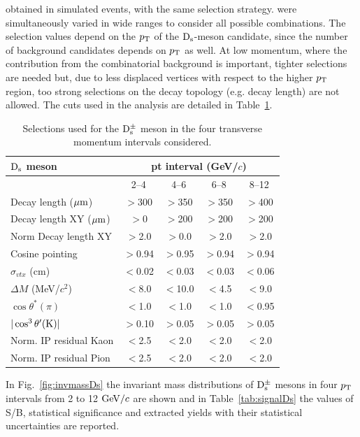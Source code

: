    obtained in simulated events, with the same selection strategy.
were simultaneously varied in wide ranges to consider all possible combinations. 
The selection values depend on the $p_{\rm T}$ of the ${\rm D_s}$-meson candidate, since
the number of background candidates depends on $p_{\rm T}$ as well.
At low momentum, where the contribution from the combinatorial
background is important, tighter selections are needed but, due to less displaced 
vertices with respect to the higher $p_{\rm T}$ region, too strong selections
on the decay topology (e.g. decay length) are not allowed.
The cuts used in the analysis are detailed in Table~\ref{tab:cutsDs}.
\begin{table}[tbh!]
\centering
\begin{tabular}{|l|c|c|c|c|} 
\hline 
 ${\rm D_s}$ meson& \multicolumn{4}{c|}{pt interval (GeV/$c$)}\\
\hline
 & 2--4  & 4--6 & 6--8 & 8--12\\
\hline
Decay length ($\mathrm{\mu m}$)        & $>$300 & $>$350 & $>$350 & $>$400\\
Decay length XY ($\mathrm{\mu m}$)     & $>$0 & $>$200 & $>$200 & $>$200\\
Norm Decay length XY          & $>$2.0& $>$0.0 & $>$2.0 & $>$2.0\\
Cosine pointing              & $>$0.94 & $>$0.95 & $>$0.94 & $>$0.94\\
$\sigma_{vtx}$  (cm)          & $<$0.02 & $<$0.03 & $<$0.03 & $<$0.06\\
$\Delta M$ (MeV/$c^{2}$) & $<$8.0 & $<$10.0 & $<$4.5 & $<$9.0\\
$\cos \theta^*(\pi)$    & $<$1.0 & $<$1.0 & $<$1.0 & $<$0.95\\
$|\cos^3 \theta^\prime({\rm K})|$        & $>$0.10 & $>$0.05 & $>$0.05 & $>$0.05\\
Norm. IP residual Kaon  & $<$2.5 & $<$2.0 & $<$2.0 & $<$2.0 \\
Norm. IP residual Pion  & $<$2.5 & $<$2.0 & $<$2.0 & $<$2.0 \\[1ex]
\hline
\end{tabular}
\caption{Selections used for the ${\rm D_s^{\pm}}$ meson in the four transverse momentum intervals considered.} 
\label{tab:cutsDs}
\end{table}
In Fig.~\ref{fig:invmassDs} the invariant mass distributions 
of ${\rm D_s^{\pm}}$ mesons in four $p_{\rm T}$ intervals from 2 to 12 $\mathrm{GeV}/c$ are shown 
and in Table~\ref{tab:signalDs} the values of S/B, statistical significance and extracted yields 
with their statistical uncertainties are reported.
